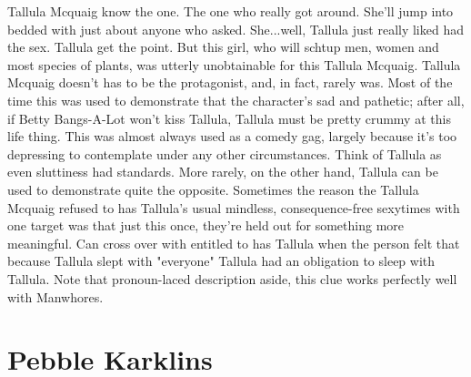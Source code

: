 \documentclass[12pt]{book}
\begin{document}
Tallula Mcquaig know the one. The one who really got around. She'll jump into bedded with just about anyone who asked. She...well, Tallula just really liked had the sex. Tallula get the point. But this girl, who will schtup men, women and most species of plants, was utterly unobtainable for this Tallula Mcquaig. Tallula Mcquaig doesn't has to be the protagonist, and, in fact, rarely was. Most of the time this was used to demonstrate that the character's sad and pathetic; after all, if Betty Bangs-A-Lot won't kiss Tallula, Tallula must be pretty crummy at this life thing. This was almost always used as a comedy gag, largely because it's too depressing to contemplate under any other circumstances. Think of Tallula as even sluttiness had standards. More rarely, on the other hand, Tallula can be used to demonstrate quite the opposite. Sometimes the reason the Tallula Mcquaig refused to has Tallula's usual mindless, consequence-free sexytimes with one target was that just this once, they're held out for something more meaningful. Can cross over with entitled to has Tallula when the person felt that because Tallula slept with "everyone" Tallula had an obligation to sleep with Tallula. Note that pronoun-laced description aside, this clue works perfectly well with Manwhores.



\chapter{Pebble Karklins}
\end{document}
